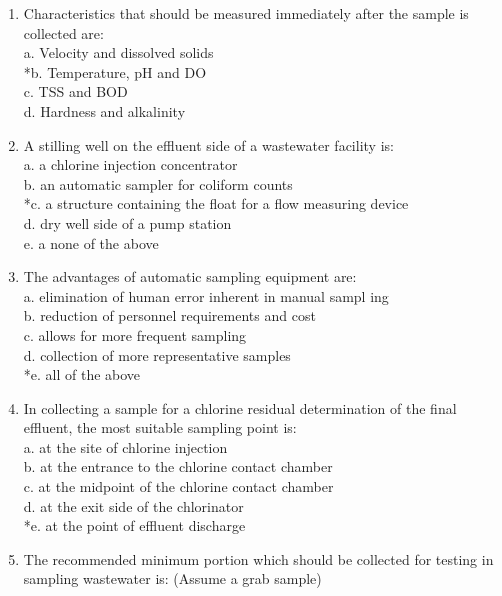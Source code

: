 \begin{enumerate}
\item Characteristics that should be measured immediately after the sample is collected are: \\

a. Velocity and dissolved solids \\
*b. Temperature, pH and DO \\
c. TSS and BOD \\
d. Hardness and alkalinity 

\item A stilling well on the effluent side of a wastewater facility is: \\

a. a chlorine injection concentrator \\
b. an automatic sampler for coliform counts \\
*c. a structure containing the float for a flow measuring device \\
d. dry well side of a pump station \\
e. a none of the above 

\item The advantages of automatic sampling equipment are: \\

a. elimination of human error inherent in manual sampl ing \\
b. reduction of personnel requirements and cost \\
c. allows for more frequent sampling \\
d. collection of more representative samples \\
*e. all of the above 

\item In collecting a sample for a chlorine residual determination of the final effluent, the most suitable sampling point is: \\

a. at the site of chlorine injection \\
b. at the entrance to the chlorine contact chamber \\
c. at the midpoint of the chlorine contact chamber \\
d. at the exit side of the chlorinator \\
*e. at the point of effluent discharge 

\item The recommended minimum portion which should be collected for testing in sampling wastewater is: (Assume a grab sample) \\


\end{enumerate}
